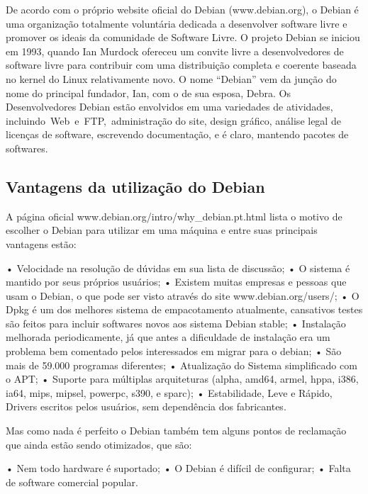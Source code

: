 De acordo com o próprio website oficial do Debian (www.debian.org), o Debian é uma organização totalmente voluntária dedicada a desenvolver software livre e promover os ideais da comunidade de Software Livre. O projeto Debian se iniciou em 1993, quando Ian Murdock ofereceu um convite livre a desenvolvedores de software livre para contribuir com uma distribuição completa e coerente baseada no kernel do Linux relativamente novo. O nome “Debian” vem da junção do nome do principal fundador, Ian, com o de sua esposa, Debra. Os Desenvolvedores Debian estão envolvidos em uma variedades de atividades, incluindo Web e FTP, administração do site, design gráfico, análise legal de licenças de software, escrevendo documentação, e é claro, mantendo pacotes de softwares.

\subsection{Vantagens da utilização do Debian}
A página oficial www.debian.org/intro/why\_debian.pt.html lista o motivo de escolher o Debian para utilizar em uma máquina e entre suas principais vantagens estão:


• Velocidade na resolução de dúvidas em sua lista de discussão;
• O sistema é mantido por seus próprios usuários;
• Existem muitas empresas e pessoas que usam o Debian, o que pode ser visto através do site www.debian.org/users/;
• O Dpkg é um dos melhores sistema de empacotamento atualmente, cansativos testes são feitos para incluir softwares novos aos sistema Debian stable;
• Instalação melhorada periodicamente, já que antes a dificuldade de instalação era um problema bem comentado pelos interessados em migrar para o debian;
• São mais de 59.000 programas diferentes;
• Atualização do Sistema simplificado com o APT;
• Suporte para múltiplas arquiteturas (alpha, amd64, armel, hppa, i386, ia64, mips, mipsel, powerpc, s390, e sparc);
• Estabilidade, Leve e Rápido, Drivers escritos pelos usuários, sem dependência dos fabricantes.

Mas como nada é perfeito o Debian também tem alguns pontos de reclamação que ainda estão sendo otimizados, que são:

• Nem todo hardware é suportado;
• O Debian é difícil de configurar;
• Falta de software comercial popular.

